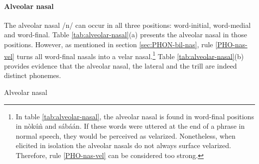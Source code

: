 \paragraph{Alveolar nasal}

The alveolar nasal  /n/ can occur in all three positions: word-initial,
word-medial and word-final. Table \ref{tab:alveolar-nasal}(a) presents the
alveolar
nasal in those positions.  However,  as mentioned in section 
\ref{sec:PHON-bil-nas}, rule \ref{PHO-nas-vel} turns all word-final nasals 
into a velar nasal.\footnote{In table \ref{tab:alveolar-nasal}, the alveolar
nasal is found in word-final positions in  {\F nòkúǹ} and {\F  sábáán}. If
these words were  uttered at the end of a phrase in normal speech, they
would be perceived as velarized. Nonetheless, when elicited in isolation the
alveolar nasals  do not always surface velarized. Therefore, rule 
\ref{PHO-nas-vel} can be considered  too strong.} Table
\ref{tab:alveolar-nasal}(b) provides evidence that the alveolar nasal, the
lateral
and the trill are indeed distinct phonemes.


\begin{table}[htb]
\centering
\caption{Alveolar nasal\label{tab:alveolar-nasal}}
\quad
{}

\end{table}



